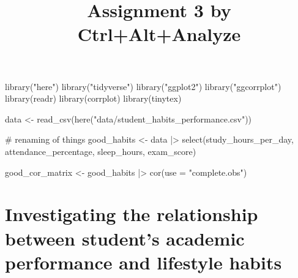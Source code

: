 \documentclass[
  11pt,
  letterpaper,
  DIV=11,
  numbers=noendperiod]{scrartcl}
\title{Assignment 3 by Ctrl+Alt+Analyze}
\author{}
\date{}
\newenvironment{Shaded}{\begin{snugshade}}{\end{snugshade}}
\newcommand{\AttributeTok}[1]{\textcolor[rgb]{0.40,0.45,0.13}{#1}}
\newcommand{\CommentTok}[1]{\textcolor[rgb]{0.37,0.37,0.37}{#1}}
\newcommand{\FunctionTok}[1]{\textcolor[rgb]{0.28,0.35,0.67}{#1}}
\newcommand{\NormalTok}[1]{\textcolor[rgb]{0.00,0.23,0.31}{#1}}
\newcommand{\OtherTok}[1]{\textcolor[rgb]{0.00,0.23,0.31}{#1}}
\newcommand{\SpecialCharTok}[1]{\textcolor[rgb]{0.37,0.37,0.37}{#1}}
\newcommand{\StringTok}[1]{\textcolor[rgb]{0.13,0.47,0.30}{#1}}
\renewcommand*\contentsname{Table of contents}
\newcommand\contentsname{Table of contents}
\begin{document}
\maketitle

\renewcommand*\contentsname{Table of contents}
{
\hypersetup{linkcolor=}
\setcounter{tocdepth}{2}
\tableofcontents
}

\newpage

\begin{Shaded}
\begin{Highlighting}[]
\FunctionTok{library}\NormalTok{(}\StringTok{"here"}\NormalTok{)}
\FunctionTok{library}\NormalTok{(}\StringTok{"tidyverse"}\NormalTok{)}
\FunctionTok{library}\NormalTok{(}\StringTok{"ggplot2"}\NormalTok{)}
\FunctionTok{library}\NormalTok{(}\StringTok{"ggcorrplot"}\NormalTok{)}
\FunctionTok{library}\NormalTok{(}\StringTok{\textquotesingle{}readr\textquotesingle{}}\NormalTok{)}
\FunctionTok{library}\NormalTok{(}\StringTok{\textquotesingle{}corrplot\textquotesingle{}}\NormalTok{)}
\FunctionTok{library}\NormalTok{(}\StringTok{\textquotesingle{}tinytex\textquotesingle{}}\NormalTok{)}
\end{Highlighting}
\end{Shaded}

\begin{Shaded}
\begin{Highlighting}[]
\NormalTok{data }\OtherTok{\textless{}{-}} \FunctionTok{read\_csv}\NormalTok{(}\FunctionTok{here}\NormalTok{(}\StringTok{"data/student\_habits\_performance.csv"}\NormalTok{)) }

\CommentTok{\# renaming of things }
\NormalTok{good\_habits }\OtherTok{\textless{}{-}}\NormalTok{ data }\SpecialCharTok{|\textgreater{}}
  \FunctionTok{select}\NormalTok{(study\_hours\_per\_day, attendance\_percentage, sleep\_hours, exam\_score)}

\NormalTok{good\_cor\_matrix }\OtherTok{\textless{}{-}}\NormalTok{ good\_habits }\SpecialCharTok{|\textgreater{}}
  \FunctionTok{cor}\NormalTok{(}\AttributeTok{use =} \StringTok{"complete.obs"}\NormalTok{)}
\end{Highlighting}
\end{Shaded}

\section{Investigating the relationship between student's academic
performance and lifestyle
habits}\label{investigating-the-relationship-between-students-academic-performance-and-lifestyle-habits}
\end{document}
